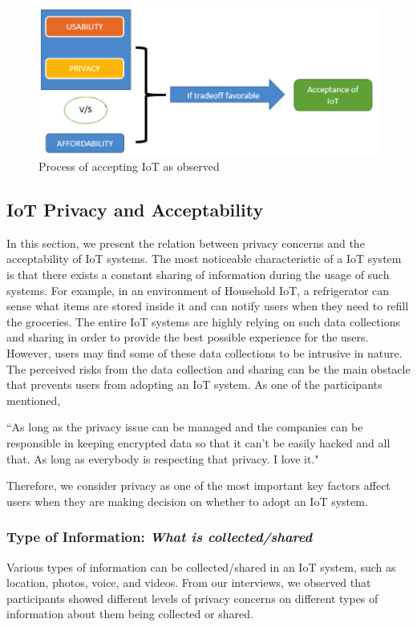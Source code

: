 \begin{figure}[htb]
	\centering
	\includegraphics[width=0.6\columnwidth]{figures/AcceptingProcess.png}
	\caption{Process of accepting IoT as observed}
	\label{fig:AcceptingProcess}
\end{figure}

\subsection{IoT Privacy and Acceptability}
In this section, we present the relation between privacy concerns and the acceptability of IoT systems. The most noticeable characteristic of a IoT system is that there exists a constant sharing of information during the usage of such systems. For example, in an environment of Household IoT, a refrigerator can sense what items are stored inside it and can notify users when they need to refill the groceries. The entire IoT systems are highly relying on such data collections and sharing in order to provide the best possible experience for the users. However, users may find some of these data collections to be intrusive in nature. The perceived risks from the data collection and sharing can be the main obstacle that prevents users from adopting an IoT system. As one of the participants mentioned, 

``As long as the privacy issue can be managed and the companies can be responsible in keeping encrypted data so that it can't be easily hacked and all that. As long as everybody is respecting that privacy. I love it." 

Therefore, we consider privacy as one of the most important key factors affect users when they are making decision on whether to adopt an IoT system.

\subsubsection{Type of Information: \textit{What is collected/shared}}
Various types of information can be collected/shared in an IoT system, such as location, photos, voice, and videos. From our interviews, we observed that participants showed different levels of privacy concerns on different types of information about them being collected or shared. 

